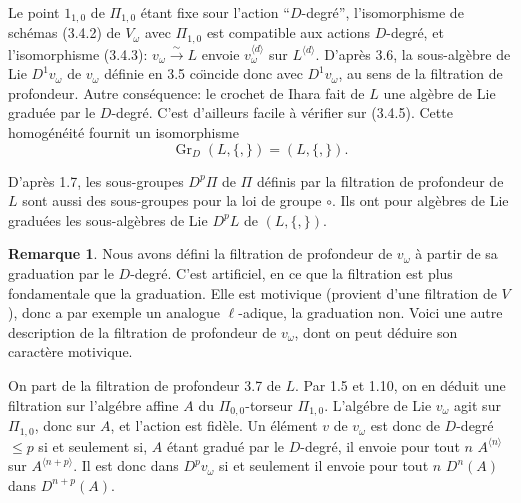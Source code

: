 \documentclass[11pt,a4paper]{article}
\theoremstyle{plain}
\theoremstyle{definition}
\newtheorem{remark}[theorem]{Remarque}
\newcommand{\Gr}{\operatorname{Gr}}
\begin{document}
Le point $1_{1,0}$ de $\Pi_{1,0}$ \'etant fixe sour l'action ``$D$-degr\'e'', l'isomorphisme de sch\'emas (3.4.2) de $V_\omega$ avec $\Pi_{1,0}$ est compatible aux actions $D$-degr\'e, et l'isomorphisme (3.4.3): $v_\omega \xrightarrow{\sim} L$ envoie $v_\omega^{\langle d \rangle}$ sur $L^{\langle d \rangle}$. D'apr\`es 3.6, la sous-alg\`ebre de Lie $D^1v_\omega$ de $v_\omega$ d\'efinie en 3.5 co\"{\i}ncide donc avec $D^1v_\omega$, au sens de la filtration de profondeur. Autre cons\'equence: le crochet de Ihara fait de $L$ une alg\`ebre de Lie gradu\'ee par le $D$-degr\'e. C'est d'ailleurs facile \`a v\'erifier sur (3.4.5). Cette homog\'en\'eit\'e fournit un isomorphisme
\begin{equation}\label{eq:3.8.1}
\Gr_D(L, \{,\}) = (L, \{,\}).
\end{equation}

D'apr\`es 1.7, les sous-groupes $D^p\Pi$ de $\Pi$ d\'efinis par la filtration de profondeur de $L$ sont aussi des sous-groupes pour la loi de groupe $\circ$. Ils ont pour alg\`ebres de Lie gradu\'ees les sous-alg\`ebres de Lie $D^pL$ de $(L, \{,\})$.

\begin{remark}\label{rmk:3.9}
Nous avons d\'efini la filtration de profondeur de $v_\omega$ \`a partir de sa graduation par le $D$-degr\'e. C'est artificiel, en ce que la filtration est plus fondamentale que la graduation. Elle est motivique (provient d'une filtration de $V$), donc a par exemple un analogue $\ell$-adique, la graduation non. Voici une autre description de la filtration de profondeur de $v_\omega$, dont on peut d\'eduire son caract\`ere motivique.

On part de la filtration de profondeur 3.7 de $L$. Par 1.5 et 1.10, on en d\'eduit une filtration sur l'alg\'ebre affine $A$ du $\Pi_{0,0}$-torseur $\Pi_{1,0}$. L'alg\'ebre de Lie $v_\omega$ agit sur $\Pi_{1,0}$, donc sur $A$, et l'action est fid\`ele. Un \'el\'ement $v$ de $v_\omega$ est donc de $D$-degr\'e $\leq p$ si et seulement si, $A$ \'etant gradu\'e par le $D$-degr\'e, il envoie pour tout $n$ $A^{\langle n \rangle}$ sur $A^{\langle n+p \rangle}$. Il est donc dans $D^p v_\omega$ si et seulement il envoie pour tout $n$ $D^n(A)$ dans $D^{n+p}(A)$.
\end{remark}
\end{document}
